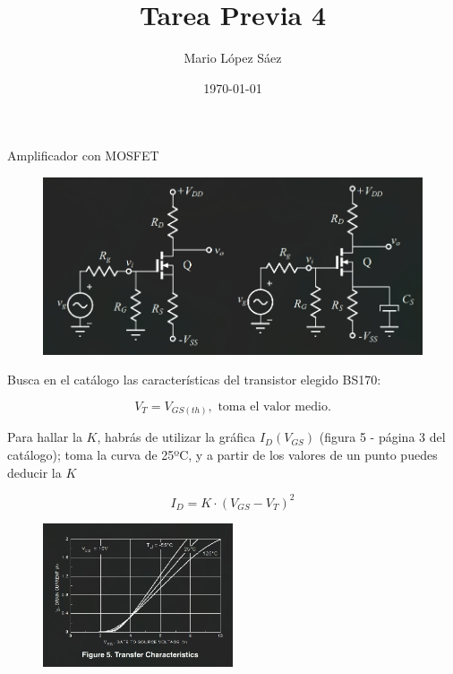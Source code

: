\documentclass{article}
\begin{document}
\title{Tarea Previa 4}
\author{Mario López Sáez}
\date{\today}
\maketitle

\begin{center}

\end{center}

\begin{center}
    {\large Amplificador con MOSFET}
\end{center}
\begin{figure}[h!]
    \centering
    \includegraphics[width=1\textwidth]{portafa.jpg}
    \label{fig:portada}
\end{figure}




\newpage
Busca en el catálogo las características del transistor elegido BS170:

\[
V_T = V_{GS(th)}, \text{ toma el valor medio.}
\]

Para hallar la \( K \), habrás de utilizar la gráfica \( I_D (V_{GS}) \) (figura 5 - página 3 del catálogo); toma la curva de 25ºC, y a partir de los valores de un punto puedes deducir la \( K \)

\[
I_D = K \cdot (V_{GS} - V_T)^2
\]


\begin{figure}[h!]
    \centering
    \includegraphics[width=0.5\textwidth]{Figure5.jpg} %
    \label{fig:transfer_characteristics}
\end{figure}
\end{document}
